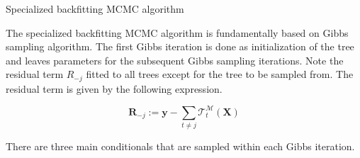 \documentclass{usiinftr}
\begin{document}
\begin{algorithm}[h]
  \caption{Specialized backfitting MCMC algorithm} \label{algSpc}
  \begin{algorithmic}[1]
    \Statex
    \EndFor
    	\EndFor
    \EndFor
    \EndFunction
  \end{algorithmic}
\end{algorithm}

The specialized backfitting MCMC algorithm is fundamentally based on Gibbs sampling algorithm. The first Gibbs iteration is done as initialization of the tree and leaves parameters for the subsequent Gibbs sampling iterations. Note the residual term $R_{-j}$ fitted to all trees except for the tree to be sampled from. The residual term is given by the following expression.

\begin{equation}
\boldsymbol{R}_{-j}:=\boldsymbol{y}-\sum_{t \neq j} \mathcal{T}_{t}^{\mathcal{M}}(\boldsymbol{X})
\end{equation}

There are three main conditionals that are sampled within each Gibbs iteration.
\end{document}
